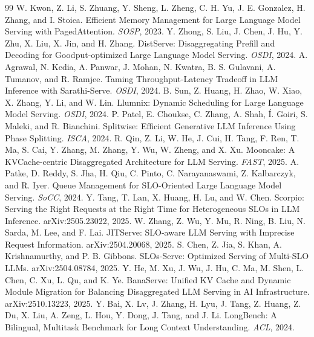 \documentclass[11pt]{article}
\begin{document}
\begin{thebibliography}{99}
 W. Kwon, Z. Li, S. Zhuang, Y. Sheng, L. Zheng, C. H. Yu, J. E. Gonzalez, H. Zhang, and I. Stoica. Efficient Memory Management for Large Language Model Serving with PagedAttention. \emph{SOSP}, 2023.
 Y. Zhong, S. Liu, J. Chen, J. Hu, Y. Zhu, X. Liu, X. Jin, and H. Zhang. DistServe: Disaggregating Prefill and Decoding for Goodput-optimized Large Language Model Serving. \emph{OSDI}, 2024.
 A. Agrawal, N. Kedia, A. Panwar, J. Mohan, N. Kwatra, B. S. Gulavani, A. Tumanov, and R. Ramjee. Taming Throughput-Latency Tradeoff in LLM Inference with Sarathi-Serve. \emph{OSDI}, 2024.
 B. Sun, Z. Huang, H. Zhao, W. Xiao, X. Zhang, Y. Li, and W. Lin. Llumnix: Dynamic Scheduling for Large Language Model Serving. \emph{OSDI}, 2024.
 P. Patel, E. Choukse, C. Zhang, A. Shah, \'I. Goiri, S. Maleki, and R. Bianchini. Splitwise: Efficient Generative LLM Inference Using Phase Splitting. \emph{ISCA}, 2024.
 R. Qin, Z. Li, W. He, J. Cui, H. Tang, F. Ren, T. Ma, S. Cai, Y. Zhang, M. Zhang, Y. Wu, W. Zheng, and X. Xu. Mooncake: A KVCache-centric Disaggregated Architecture for LLM Serving. \emph{FAST}, 2025.
 A. Patke, D. Reddy, S. Jha, H. Qiu, C. Pinto, C. Narayanaswami, Z. Kalbarczyk, and R. Iyer. Queue Management for SLO-Oriented Large Language Model Serving. \emph{SoCC}, 2024.
 Y. Tang, T. Lan, X. Huang, H. Lu, and W. Chen. Scorpio: Serving the Right Requests at the Right Time for Heterogeneous SLOs in LLM Inference. arXiv:2505.23022, 2025.
 W. Zhang, Z. Wu, Y. Mu, R. Ning, B. Liu, N. Sarda, M. Lee, and F. Lai. JITServe: SLO-aware LLM Serving with Imprecise Request Information. arXiv:2504.20068, 2025.
 S. Chen, Z. Jia, S. Khan, A. Krishnamurthy, and P. B. Gibbons. SLOs-Serve: Optimized Serving of Multi-SLO LLMs. arXiv:2504.08784, 2025.
 Y. He, M. Xu, J. Wu, J. Hu, C. Ma, M. Shen, L. Chen, C. Xu, L. Qu, and K. Ye. BanaServe: Unified KV Cache and Dynamic Module Migration for Balancing Disaggregated LLM Serving in AI Infrastructure. arXiv:2510.13223, 2025.
 Y. Bai, X. Lv, J. Zhang, H. Lyu, J. Tang, Z. Huang, Z. Du, X. Liu, A. Zeng, L. Hou, Y. Dong, J. Tang, and J. Li. LongBench: A Bilingual, Multitask Benchmark for Long Context Understanding. \emph{ACL}, 2024.
\end{thebibliography}
 
\end{document}
